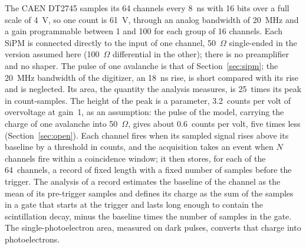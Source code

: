 \documentclass[11pt]{article}
\begin{document}
The CAEN DT2745 samples its 64 channels every 8~ns with 16 bits over a
full scale of 4~V, so one count is 61~\textmu V, through an analog
bandwidth of 20~MHz and a gain programmable between 1 and 100 for each
group of 16 channels. Each SiPM is connected directly to the input of one
channel, 50~$\Omega$ single-ended in the version assumed here (100~$\Omega$
differential in the other); there is no preamplifier and no shaper. The
pulse of one avalanche is that of Section~\ref{sec:sipm}; the 20~MHz
bandwidth of the digitizer, an 18~ns rise, is short compared with its rise
and is neglected. Its area, the quantity the analysis measures, is 25~times
its peak in count-samples. The height of the peak is a parameter, 3.2~counts
per volt of overvoltage at gain~1, as an assumption: the pulse of the
model, carrying the charge of one avalanche into 50~$\Omega$, gives about
0.6~counts per volt, five times less (Section~\ref{sec:open}). Each channel fires when its sampled signal rises
above its baseline by a threshold in counts, and the acquisition takes an
event when $N$ channels fire within a coincidence window; it then stores,
for each of the 64~channels, a record of fixed length with a fixed number
of samples before the trigger. The analysis of a record estimates the
baseline of the channel as the mean of its pre-trigger samples and defines
its charge as the sum of the samples in a gate that starts at the trigger
and lasts long enough to contain the scintillation decay, minus the
baseline times the number of samples in the gate. The single-photoelectron
area, measured on dark pulses, converts that charge into photoelectrons.
\end{document}
